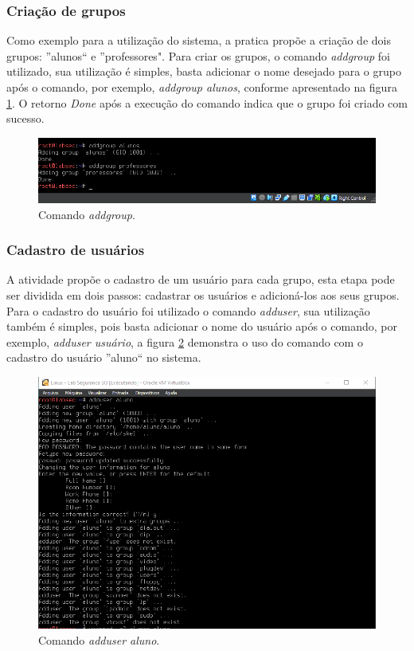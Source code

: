\documentclass[
	12pt,				%
	oneside,   	        %
	a4paper,			%
	english,			%
	french,				%
	spanish,			%
	brazil,				%
	]{pacotes/abntex2}
\begin{document}
\subsubsection{Criação de grupos}
Como exemplo para a utilização do sistema, a pratica propõe a criação de dois grupos: ''alunos`` e ''professores". Para criar os grupos, o comando \textit{addgroup} foi utilizado, sua utilização é simples, basta adicionar o nome desejado para o grupo após o comando, por exemplo, \textit{addgroup alunos}, conforme apresentado na figura \ref{fig:addgroup}. O retorno \textit{Done} após a execução do comando indica que o grupo foi criado com sucesso.

\begin{figure}[H]
  \centering
  \includegraphics[scale=0.7]{figuras/addgroups.png}
  \caption{Comando \textit{addgroup}.}
  \label{fig:addgroup}
\end{figure}

\subsubsection{Cadastro de usuários}
A atividade propõe o cadastro de um usuário para cada grupo, esta etapa pode ser dividida em dois passos: cadastrar os usuários e adicioná-los aos seus grupos. Para o cadastro do usuário foi utilizado o comando \textit{adduser}, sua utilização também é simples, pois basta adicionar o nome do usuário após o comando, por exemplo, \textit{adduser usuário}, a figura \ref{fig:add_aluno} demonstra o uso do comando com o cadastro do usuário ''aluno`` no sistema.

\begin{figure}[H]
  \centering
  \includegraphics[scale=0.8]{figuras/adduser_aluno.png}
  \caption{Comando \textit{adduser aluno}.}
  \label{fig:add_aluno}
\end{figure}
\end{document}
